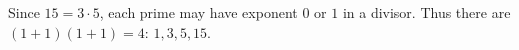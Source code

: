 Since $15=3\cdot5$, each prime may have exponent $0$ or $1$ in a divisor. Thus there are $(1+1)(1+1)=\boxed4$: $1,3,5,15$.
